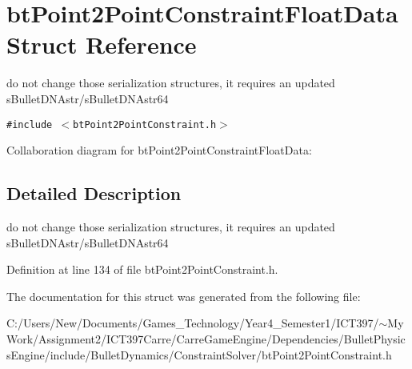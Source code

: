 \hypertarget{structbt_point2_point_constraint_float_data}{
\section{btPoint2PointConstraintFloatData Struct Reference}
\label{structbt_point2_point_constraint_float_data}
}
do not change those serialization structures, it requires an updated sBulletDNAstr/sBulletDNAstr64  


{\tt \#include $<$btPoint2PointConstraint.h$>$}

Collaboration diagram for btPoint2PointConstraintFloatData:

\subsection{Detailed Description}
do not change those serialization structures, it requires an updated sBulletDNAstr/sBulletDNAstr64 

Definition at line 134 of file btPoint2PointConstraint.h.

The documentation for this struct was generated from the following file:\begin{CompactItemize}
\item 
C:/Users/New/Documents/Games\_\-Technology/Year4\_\-Semester1/ICT397/$\sim$My Work/Assignment2/ICT397Carre/CarreGameEngine/Dependencies/BulletPhysicsEngine/include/BulletDynamics/ConstraintSolver/btPoint2PointConstraint.h\end{CompactItemize}
